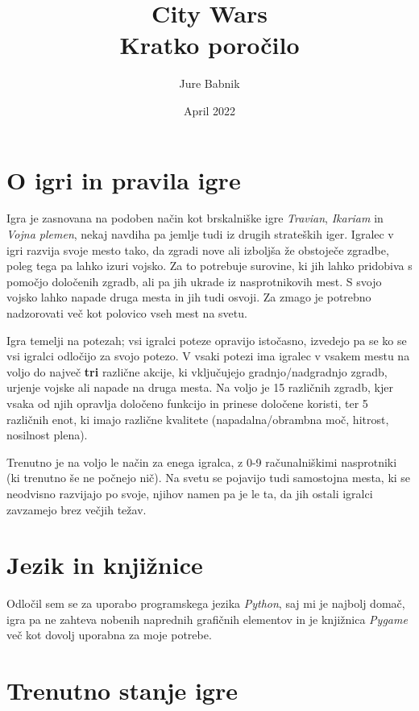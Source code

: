 \documentclass[a4paper, 16pt]{article}
\title{City Wars \\ Kratko poročilo}
\date{April 2022}
\author{Jure Babnik}
\begin{document}
\maketitle

\section{O igri in pravila igre}

Igra je zasnovana na podoben način kot brskalniške igre \textit{Travian}, \textit{Ikariam} in \textit{Vojna plemen}, nekaj navdiha pa jemlje tudi iz drugih strateških iger.
Igralec v igri razvija svoje mesto tako, da zgradi nove ali izboljša že obstoječe zgradbe, poleg tega pa lahko izuri vojsko. Za to potrebuje surovine, ki jih lahko pridobiva s pomočjo določenih zgradb, 
ali pa jih ukrade iz nasprotnikovih mest. S svojo vojsko lahko napade druga mesta in jih tudi osvoji. Za zmago je potrebno nadzorovati več kot polovico vseh mest na svetu.

Igra temelji na potezah; vsi igralci poteze opravijo istočasno, izvedejo pa se ko se vsi igralci odločijo za svojo potezo. V vsaki potezi ima igralec v vsakem mestu na voljo 
do največ \textbf{tri} različne akcije, ki vključujejo gradnjo/nadgradnjo zgradb, urjenje vojske ali napade na druga mesta. Na voljo je 15 različnih zgradb, kjer vsaka od njih 
opravlja določeno funkcijo in prinese določene koristi, ter 5 različnih enot, ki imajo različne kvalitete (napadalna/obrambna moč, hitrost, nosilnost plena).

Trenutno je na voljo le način za enega igralca, z 0-9 računalniškimi nasprotniki (ki trenutno še ne počnejo nič). Na svetu se pojavijo tudi samostojna mesta, ki se neodvisno razvijajo
po svoje, njihov namen pa je le ta, da jih ostali igralci zavzamejo brez večjih težav.

\section{Jezik in knjižnice}

Odločil sem se za uporabo programskega jezika \textit{Python}, saj mi je najbolj domač, igra pa ne zahteva nobenih naprednih grafičnih elementov in je knjižnica 
\textit{Pygame} več kot dovolj uporabna za moje potrebe. 

\section{Trenutno stanje igre}
\end{document}
